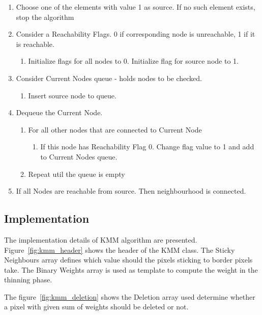 \documentclass{article}
\begin{document}
\begin{enumerate}
	\item Choose one of the elements with value 1 as source. If no such element exists, stop the algorithm

	\item Consider a Reachability Flags. 0 if corresponding node is unreachable, 1 if it is reachable.
		\begin{enumerate}
		\item Initialize flags for all nodes to 0. Initialize flag for source node to 1.
		\end{enumerate}
	\item Consider Current Nodes queue - holds nodes to be checked.
	\begin{enumerate}
		\item Insert source node to queue.
	\end{enumerate}
	
	\item Dequeue the Current Node.
			\begin{enumerate}
		\item For all other nodes that are connected to Current Node
		\begin{enumerate}
			\item If this node has Reachability Flag 0. Change flag value to 1 and add to Current Nodes queue.
		\end{enumerate}
		\item Repeat util the queue is empty
		\end{enumerate}

	\item If all Nodes are reachable from source. Then neighbourhood is connected.
	
\end{enumerate}
\subsection{Implementation}

The implementation details of KMM algorithm are presented.
Figure~\ref{fig:kmm_header} shows the header of the KMM class. The Sticky Neighbours array defines which value should the pixels sticking to border pixels take. The Binary Weights array is used as template to compute the weight in the thinning phase.

The figure~\ref{fig:kmm_deletion} shows the Deletion array used determine whether a pixel with given sum of weights should be deleted or not.
\end{document}
